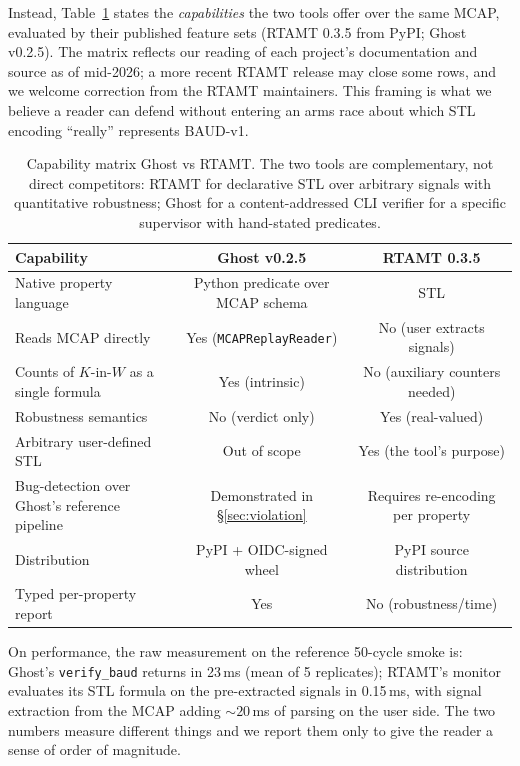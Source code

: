 \documentclass[acmsmall,nonacm=true,review=false]{acmart}
\theoremstyle{plain}
\begin{document}
Instead, Table~\ref{tab:rtamt-bench} states the \emph{capabilities}
the two tools offer over the same MCAP, evaluated by their
published feature sets (RTAMT 0.3.5 from PyPI; Ghost v0.2.5). The
matrix reflects our reading of each project's documentation and
source as of mid-2026; a more recent RTAMT release may close some
rows, and we welcome correction from the RTAMT maintainers. This
framing is what we believe a reader can defend without entering an
arms race about which STL encoding ``really'' represents BAUD-v1.

\begin{table}[h]
\centering
\footnotesize
\begin{tabular}{lcc}
\toprule
\textbf{Capability} & \textbf{Ghost v0.2.5} & \textbf{RTAMT 0.3.5} \\
\midrule
Native property language                              & Python predicate over MCAP schema & STL \\
Reads MCAP directly                                   & Yes (\texttt{MCAPReplayReader})   & No (user extracts signals) \\
Counts of $K$-in-$W$ as a single formula              & Yes (intrinsic)                   & No (auxiliary counters needed) \\
Robustness semantics                                  & No (verdict only)                 & Yes (real-valued) \\
Arbitrary user-defined STL                            & Out of scope                      & Yes (the tool's purpose) \\
Bug-detection over Ghost's reference pipeline         & Demonstrated in \S\ref{sec:violation}  & Requires re-encoding per property \\
Distribution                                          & PyPI + OIDC-signed wheel          & PyPI source distribution \\
Typed per-property report                             & Yes                               & No (robustness/time) \\
\bottomrule
\end{tabular}
\caption{Capability matrix Ghost vs RTAMT. The two tools are
complementary, not direct competitors: RTAMT for declarative STL
over arbitrary signals with quantitative robustness; Ghost for a
content-addressed CLI verifier for a specific supervisor with
hand-stated predicates.}
\label{tab:rtamt-bench}
\end{table}

On performance, the raw measurement on the reference 50-cycle smoke
is: Ghost's \texttt{verify\_baud} returns in 23\,ms (mean of 5
replicates); RTAMT's monitor evaluates its STL formula on the
pre-extracted signals in 0.15\,ms, with signal extraction from the
MCAP adding ${\sim}20$\,ms of parsing on the user side. The two
numbers measure different things and we report them only to give
the reader a sense of order of magnitude.
\end{document}
